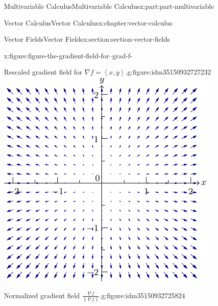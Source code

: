 \documentclass[twoside,10pt,]{book}
\numberwithin{equation}{part}
\newcommand{\grad}{\nabla}
\newcommand{\norm}[1]{\left\| #1 \right\|}
\newcommand{\dotprod}[1]{\left\langle #1 \right\rangle}
\begin{document}
\begin{partptx}{Multivariable Calculus}{}{Multivariable Calculus}{}{}{x:part:part-multivariable}
\begin{chapterptx}{Vector Calculus}{}{Vector Calculus}{}{}{x:chapter:vector-calculus}
\begin{sectionptx}{Vector Fields}{}{Vector Fields}{}{}{x:section:section-vector-fields}
\begin{introduction}{}
\begin{figureptx}{}{x:figure:figure-the-gradient-field-for--grad-f-}{}
\begin{sidebyside}{2}{0}{0}{0}
\begin{sbspanel}{0.5}
\begin{subfigureptx}{Rescaled gradient field for \(\grad f = \dotprod{x,y}\).}{g:figure:idm35150932727232}{}
\includegraphics[width=\linewidth]{generated/asymptote/image-the-gradient-field-for--grad-f-.pdf}
\tcblower
\end{subfigureptx}%
\end{sbspanel}%
\begin{sbspanel}{0.5}%
\begin{subfigureptx}{Normalized gradient field \(\frac{\grad f}{\norm{\grad f}}\).}{g:figure:idm35150932725824}{}%

\end{subfigureptx}
\end{sbspanel}
\end{sidebyside}
\end{figureptx}
\end{introduction}
\end{sectionptx}
\end{chapterptx}
\end{partptx}
\end{document}
